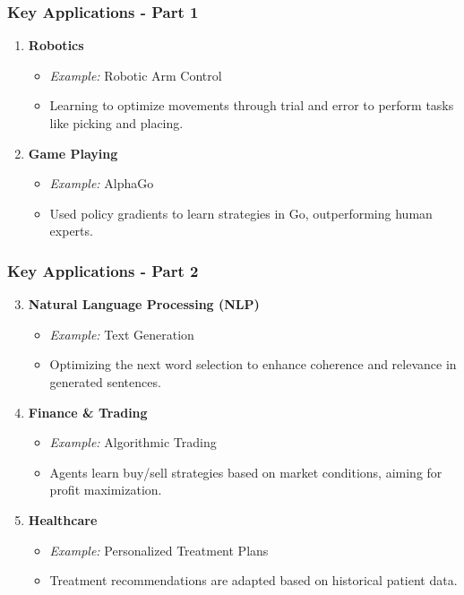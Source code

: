 \documentclass[aspectratio=169]{beamer}
\begin{document}
\begin{frame}[fragile]
    \frametitle{Key Applications - Part 1}

    \begin{enumerate}
        \item \textbf{Robotics}
        \begin{itemize}
            \item \textit{Example:} Robotic Arm Control
            \item Learning to optimize movements through trial and error to perform tasks like picking and placing.
        \end{itemize}
        
        \item \textbf{Game Playing}
        \begin{itemize}
            \item \textit{Example:} AlphaGo
            \item Used policy gradients to learn strategies in Go, outperforming human experts.
        \end{itemize}
    \end{enumerate}
\end{frame}

\begin{frame}[fragile]
    \frametitle{Key Applications - Part 2}

    \begin{enumerate}
        \setcounter{enumi}{2} %
        \item \textbf{Natural Language Processing (NLP)}
        \begin{itemize}
            \item \textit{Example:} Text Generation
            \item Optimizing the next word selection to enhance coherence and relevance in generated sentences.
        \end{itemize}

        \item \textbf{Finance \& Trading}
        \begin{itemize}
            \item \textit{Example:} Algorithmic Trading
            \item Agents learn buy/sell strategies based on market conditions, aiming for profit maximization.
        \end{itemize}

        \item \textbf{Healthcare}
        \begin{itemize}
            \item \textit{Example:} Personalized Treatment Plans
            \item Treatment recommendations are adapted based on historical patient data.
        \end{itemize}
    \end{enumerate}
\end{frame}
\end{document}
